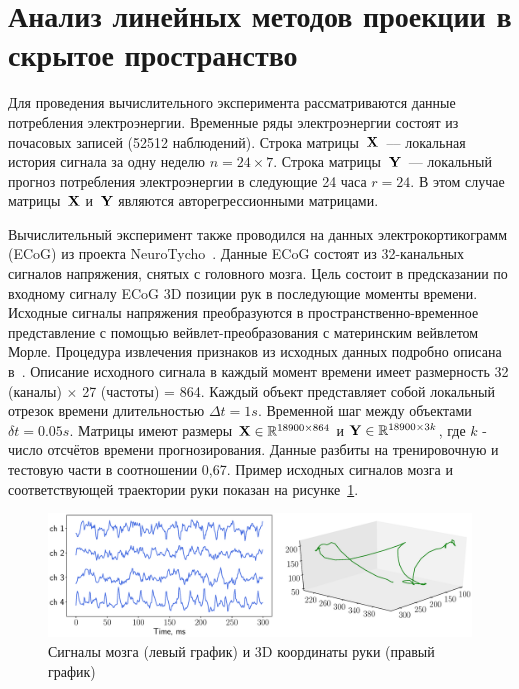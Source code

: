 \hrulefill

\section{Анализ линейных методов проекции в скрытое пространство}

Для проведения вычислительного эксперимента рассматриваются данные потребления электроэнергии.
Временные ряды электроэнергии состоят из почасовых записей (52512 наблюдений). 
Строка матрицы~$\mathbf{X}$~--– локальная история сигнала за одну неделю $n = 24 \times 7$. 
Строка матрицы~$\mathbf{Y}$~--- локальный прогноз потребления электроэнергии в следующие 24 часа $r = 24$. 
В этом случае матрицы~$\mathbf{X}$ и~$\mathbf{Y}$ являются авторегрессионными матрицами.

Вычислительный эксперимент также проводился на данных электрокортикограмм (ECoG) из проекта NeuroTycho~\cite{shimoda2012decoding}.
Данные ECoG состоят из 32-канальных сигналов напряжения, снятых с головного мозга.
Цель состоит в предсказании по входному сигналу ECoG 3D позиции рук в последующие моменты времени.
Исходные сигналы напряжения преобразуются в пространственно-временное представление с помощью вейвлет-преобразования с материнским вейвлетом Морле.
Процедура извлечения признаков из исходных данных подробно описана в~\cite{chao2010long,eliseyev2016penalized}.
Описание исходного сигнала в каждый момент времени имеет размерность 32 (каналы) $\times $ 27 (частоты) = 864.
Каждый объект представляет собой локальный отрезок времени длительностью $\Delta t = 1s$. 
Временной шаг между объектами $\delta t = 0.05 s$.
Матрицы имеют размеры $\mathbf{X} \in \mathbb{R}^{18900 \times 864}$ и $\mathbf{Y} \in \mathbb{R}^{18900 \times 3k}$, где $k$ - число отсчётов времени прогнозирования.
Данные разбиты на тренировочную и тестовую части в соотношении 0,67. 
Пример исходных сигналов мозга и соответствующей траектории руки показан на рисунке~\ref{ch2:fig:ecog_data}.

\begin{figure}
	\centering
	\includegraphics[width=\linewidth]{figs/ch2/ecog_data}
	\caption{Сигналы мозга (левый график) и 3D координаты руки (правый график)}
	\label{ch2:fig:ecog_data}
\end{figure}

